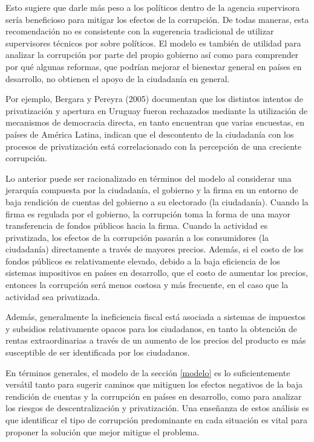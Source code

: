 \documentclass[
  12pt,
  spanish,
]{book}
\begin{document}
Esto sugiere que darle más peso a los políticos dentro de la agencia supervisora sería beneficioso para mitigar los efectos de la corrupción. De todas maneras, esta recomendación no es consistente con la sugerencia tradicional de utilizar supervisores técnicos por sobre políticos. El modelo es también de utilidad para analizar la corrupción por parte del propio gobierno así como para comprender por qué algunas reformas, que podrían mejorar el bienestar general en países en desarrollo, no obtienen el apoyo de la ciudadanía en general.

Por ejemplo, Bergara y Pereyra (2005) documentan que los distintos intentos de privatización y apertura en Uruguay fueron rechazados mediante la utilización de mecanismos de democracia directa, en tanto \citet{Martimort2009} encuentran que varias encuestas, en países de América Latina, indican que el descontento de la ciudadanía con los procesos de privatización está correlacionado con la percepción de una creciente corrupción.

Lo anterior puede ser racionalizado en términos del modelo al considerar una jerarquía compuesta por la ciudadanía, el gobierno y la firma en un entorno de baja rendición de cuentas del gobierno a su electorado (la ciudadanía). Cuando la firma es regulada por el gobierno, la corrupción toma la forma de una mayor transferencia de fondos públicos hacia la firma. Cuando la actividad es privatizada, los efectos de la corrupción pasarán a los consumidores (la ciudadanía) directamente a través de mayores precios. Además, si el costo de los fondos públicos es relativamente elevado, debido a la baja eficiencia de los sistemas impositivos en países en desarrollo, que el costo de aumentar los precios, entonces la corrupción será menos costosa y más frecuente, en el caso que la actividad sea privatizada.

Además, generalmente la ineficiencia fiscal está asociada a sistemas de impuestos y subsidios relativamente opacos para los ciudadanos, en tanto la obtención de rentas extraordinarias a través de un aumento de los precios del producto es más susceptible de ser identificada por los ciudadanos.

En términos generales, el modelo de la sección \ref{modelo} es lo suficientemente versátil tanto para sugerir caminos que mitiguen los efectos negativos de la baja rendición de cuentas y la corrupción en países en desarrollo, como para analizar los riesgos de descentralización y privatización. Una enseñanza de estos análisis es que identificar el tipo de corrupción predominante en cada situación es vital para proponer la solución que mejor mitigue el problema.
\end{document}
